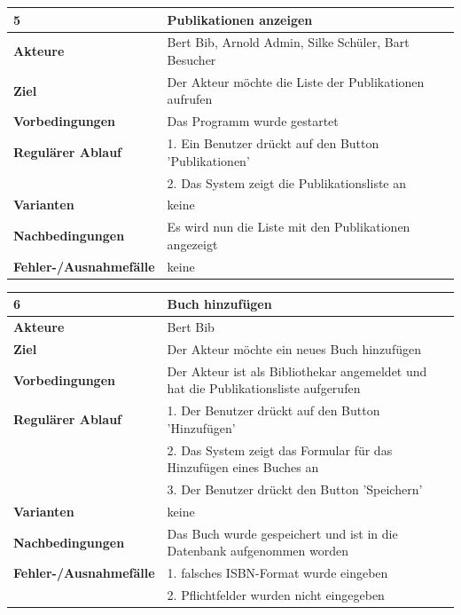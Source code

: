 \documentclass[fontsize=12pt,paper=a4,twoside]{scrartcl}
\begin{document}
\begin{table}[htbp]
\label{5}
\begin{tabular}{|l|p{10cm}|}
\hline 
\textbf{5} & \textbf{Publikationen anzeigen} \\ \hline
\textbf{Akteure} & Bert Bib, Arnold Admin, Silke Schüler, Bart Besucher\\ \hline
\textbf{Ziel} & Der Akteur möchte die Liste der Publikationen aufrufen  \\ \hline
\textbf{Vorbedingungen} & Das Programm wurde gestartet  \\ \hline
\textbf{Regulärer Ablauf} & 
1. Ein Benutzer drückt auf den Button 'Publikationen' \\
&2. Das System zeigt die Publikationsliste an\\
\hline
\textbf{Varianten} & 
keine \\ \hline
\textbf{Nachbedingungen} & Es wird nun die Liste mit den Publikationen angezeigt \\ \hline
\textbf{Fehler-/Ausnahmefälle} & keine\\
\hline
\end{tabular}
\end{table}

\begin{table}[htbp]
\label{6}
\begin{tabular}{|l|p{10cm}|}
\hline 
\textbf{6} & \textbf{Buch hinzufügen} \\ \hline
\textbf{Akteure} & Bert Bib\\ \hline
\textbf{Ziel} & Der Akteur möchte ein neues Buch hinzufügen \\ \hline
\textbf{Vorbedingungen} & Der Akteur ist als Bibliothekar angemeldet und hat die Publikationsliste 
aufgerufen  \\ \hline
\textbf{Regulärer Ablauf} & 
1. Der Benutzer drückt auf den Button 'Hinzufügen' \\
&2. Das System zeigt das Formular für das Hinzufügen eines Buches an\\
&3. Der Benutzer drückt den Button 'Speichern'\\
\hline
\textbf{Varianten} & 
keine \\ \hline
\textbf{Nachbedingungen} & Das Buch wurde gespeichert und ist in die Datenbank aufgenommen 
worden\\ \hline
\textbf{Fehler-/Ausnahmefälle} & 1. falsches ISBN-Format wurde eingeben\\
&2. Pflichtfelder wurden nicht eingegeben\\
\hline
\end{tabular}
\end{table}
\end{document}
